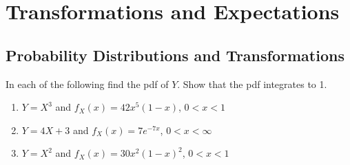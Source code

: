 \chapter{Transformations and Expectations}

\section{Probability Distributions and Transformations}

\begin{problembox}
In each of the following find the pdf of $Y$. Show that the pdf integrates to 1.
\begin{enumerate}[label=(\alph*)]
    \item $Y = X^3$ and $f_X(x) = 42x^5(1-x)$, $0 < x < 1$
    \item $Y = 4X + 3$ and $f_X(x) = 7e^{-7x}$, $0 < x < \infty$
    \item $Y = X^2$ and $f_X(x) = 30x^2(1-x)^2$, $0 < x < 1$
\end{enumerate}
\end{problembox}

